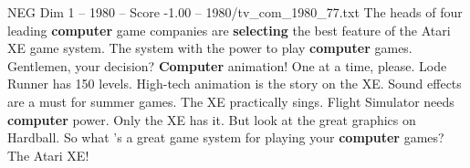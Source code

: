 \begin{textsample}{NEG Dim 1 – 1980 – Score -1.00 – 1980/tv\_com\_1980\_77.txt}  \label{ex:f1_neg_058}
The heads of four leading \textbf{computer} game companies are \textbf{selecting} the best feature of the Atari XE game system.
The system with the power to play \textbf{computer} games.
Gentlemen, your decision? \textbf{Computer} animation!
One at a time, please.
Lode Runner has 150 levels.
High-tech animation is the story on the XE.
Sound effects are a must for summer games.
The XE practically sings.
Flight Simulator needs \textbf{computer} power.
Only the XE has it.
But look at the great graphics on Hardball.
So what 's a great game system for playing your \textbf{computer} games?
The Atari XE!

\end{textsample}
